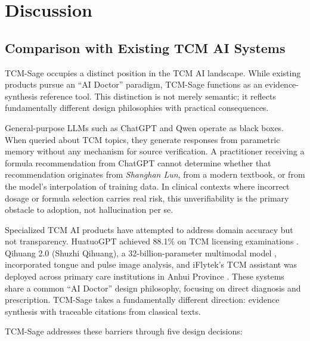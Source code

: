 \chapter{Discussion}

\section{Comparison with Existing TCM AI Systems}

TCM-Sage occupies a distinct position in the TCM AI landscape. While existing products pursue an ``AI Doctor'' paradigm, TCM-Sage functions as an evidence-synthesis reference tool. This distinction is not merely semantic; it reflects fundamentally different design philosophies with practical consequences.

General-purpose LLMs such as ChatGPT and Qwen operate as black boxes. When queried about TCM topics, they generate responses from parametric memory without any mechanism for source verification. A practitioner receiving a formula recommendation from ChatGPT cannot determine whether that recommendation originates from \textit{Shanghan Lun}, from a modern textbook, or from the model's interpolation of training data. In clinical contexts where incorrect dosage or formula selection carries real risk, this unverifiability is the primary obstacle to adoption, not hallucination per se.

Specialized TCM AI products have attempted to address domain accuracy but not transparency. HuatuoGPT achieved 88.1\% on TCM licensing examinations \cite{huatuogpt2023}. Qihuang 2.0 (Shuzhi Qihuang), a 32-billion-parameter multimodal model \cite{qihuang2024ecnu}, incorporated tongue and pulse image analysis, and iFlytek's TCM assistant was deployed across primary care institutions in Anhui Province \cite{iflytek2024cnr}. These systems share a common ``AI Doctor'' design philosophy, focusing on direct diagnosis and prescription. TCM-Sage takes a fundamentally different direction: evidence synthesis with traceable citations from classical texts.

TCM-Sage addresses these barriers through five design decisions:

